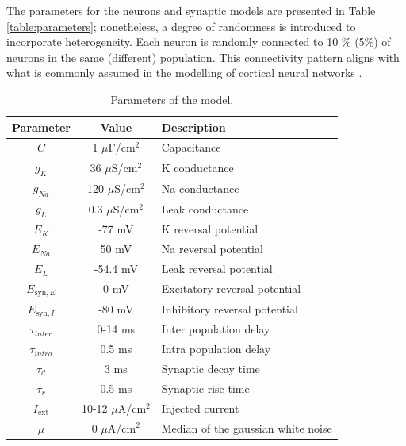 \documentclass[../main.tex]{subfiles}
\begin{document}
The parameters for the neurons and synaptic models are presented in Table \ref{table:parameters}; nonetheless, a degree of randomness is introduced to incorporate heterogeneity.
Each neuron is randomly connected to 10 $\%$ (5$\%$) of neurons in the same (different) population.
This connectivity pattern aligns with what is commonly assumed in the modelling of cortical neural networks \citep{izhikevich_simple_2003,lopez2017role}.
\begin{table}[htbp]
    \def\arraystretch{1.3}%
    \centering
    \caption{Parameters of the model.}
    \begin{tabularx}{\textwidth}{|c|c|X|} \hline
         \textbf{Parameter} & \textbf{Value} & \textbf{Description} \\
         \hline
         $C$                & 1 $\mu$F/cm$^2$ & Capacitance\\      \hline
         $g_K$              & 36 $\mu$S/cm$^2$  & K conductance\\    \hline
         $g_{Na}$           & 120 $\mu$S/cm$^2$      & Na conductance\\   \hline
         $g_L$              & 0.3 $\mu$S/cm$^2$      & Leak conductance\\ \hline
         $E_K$              & -77 mV           & K reversal potential\\   \hline
         $E_{Na}$           & 50 mV            & Na reversal potential\\   \hline
         $E_L$              & -54.4 mV         & Leak reversal potential\\ \hline
         $E_{\text{syn},E}$ & 0 mV             & Excitatory reversal potential\\   \hline
         $E_{\text{syn},I}$ & -80 mV           & Inhibitory reversal potential\\ \hline
         $\tau_{inter}$     & 0-14 ms          & Inter population delay\\ \hline
         $\tau_{intra}$     & 0.5 ms           & Intra population delay \\ \hline
         $\tau_d$           & 3 ms             & Synaptic decay time \\ \hline
         $\tau_r$           & 0.5 ms           & Synaptic rise time\\ \hline
         $I_{\text{ext}}$   & 10-12 $\mu$A/cm$^2$    & Injected current\\ \hline
         $\mu$    			& 0 $\mu$A/cm$^2$     & Median of the gaussian white noise\\ \hline

\end{tabularx}
\end{table}
\end{document}
